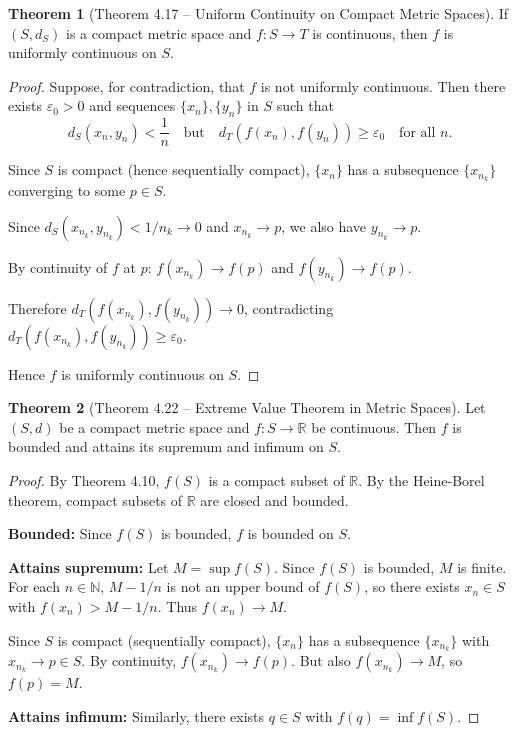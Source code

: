 \documentclass[12pt,a4paper]{article}
\theoremstyle{definition}
\newtheorem{theorem}{Theorem}[section]
\newcommand{\R}{\mathbb{R}}
\newcommand{\N}{\mathbb{N}}
\newcommand{\eps}{\varepsilon}
\begin{document}
\begin{theorem}[Theorem 4.17 -- Uniform Continuity on Compact Metric Spaces]
If $(S, d_S)$ is a compact metric space and $f: S \to T$ is continuous, then $f$ is uniformly continuous on $S$.
\end{theorem}

\begin{proof}
Suppose, for contradiction, that $f$ is not uniformly continuous. Then there exists $\eps_0 > 0$ and sequences $\{x_n\}, \{y_n\}$ in $S$ such that
\[
    d_S(x_n, y_n) < \frac{1}{n} \quad \text{but} \quad d_T(f(x_n), f(y_n)) \geq \eps_0 \quad \text{for all } n.
\]

Since $S$ is compact (hence sequentially compact), $\{x_n\}$ has a subsequence $\{x_{n_k}\}$ converging to some $p \in S$.

Since $d_S(x_{n_k}, y_{n_k}) < 1/n_k \to 0$ and $x_{n_k} \to p$, we also have $y_{n_k} \to p$.

By continuity of $f$ at $p$: $f(x_{n_k}) \to f(p)$ and $f(y_{n_k}) \to f(p)$.

Therefore $d_T(f(x_{n_k}), f(y_{n_k})) \to 0$, contradicting $d_T(f(x_{n_k}), f(y_{n_k})) \geq \eps_0$.

Hence $f$ is uniformly continuous on $S$.
\end{proof}

\begin{theorem}[Theorem 4.22 -- Extreme Value Theorem in Metric Spaces]
Let $(S, d)$ be a compact metric space and $f: S \to \R$ be continuous. Then $f$ is bounded and attains its supremum and infimum on $S$.
\end{theorem}

\begin{proof}
By Theorem 4.10, $f(S)$ is a compact subset of $\R$. By the Heine-Borel theorem, compact subsets of $\R$ are closed and bounded.

\textbf{Bounded:} Since $f(S)$ is bounded, $f$ is bounded on $S$.

\textbf{Attains supremum:} Let $M = \sup f(S)$. Since $f(S)$ is bounded, $M$ is finite. For each $n \in \N$, $M - 1/n$ is not an upper bound of $f(S)$, so there exists $x_n \in S$ with $f(x_n) > M - 1/n$. Thus $f(x_n) \to M$.

Since $S$ is compact (sequentially compact), $\{x_n\}$ has a subsequence $\{x_{n_k}\}$ with $x_{n_k} \to p \in S$. By continuity, $f(x_{n_k}) \to f(p)$. But also $f(x_{n_k}) \to M$, so $f(p) = M$.

\textbf{Attains infimum:} Similarly, there exists $q \in S$ with $f(q) = \inf f(S)$.
\end{proof}
\end{document}

